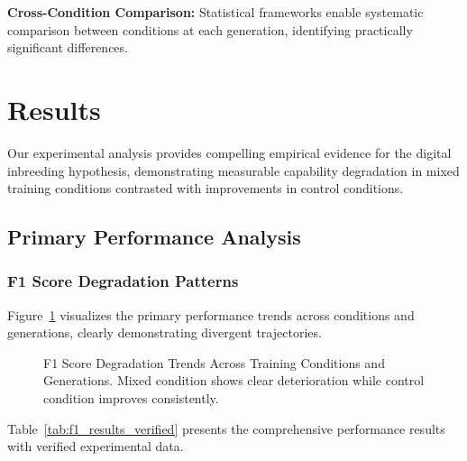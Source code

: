 \documentclass[11pt]{article}
\begin{document}
\textbf{Cross-Condition Comparison:} Statistical frameworks enable systematic comparison between conditions at each generation, identifying practically significant differences.

\section{Results}

Our experimental analysis provides compelling empirical evidence for the digital inbreeding hypothesis, demonstrating measurable capability degradation in mixed training conditions contrasted with improvements in control conditions.

\subsection{Primary Performance Analysis}

\subsubsection{F1 Score Degradation Patterns}

Figure~\ref{fig:f1_trends} visualizes the primary performance trends across conditions and generations, clearly demonstrating divergent trajectories.

\begin{figure}[H]
\centering
{}
\caption{F1 Score Degradation Trends Across Training Conditions and Generations. Mixed condition shows clear deterioration while control condition improves consistently.}
\label{fig:f1_trends}
\end{figure}

Table~\ref{tab:f1_results_verified} presents the comprehensive performance results with verified experimental data.
\end{document}
